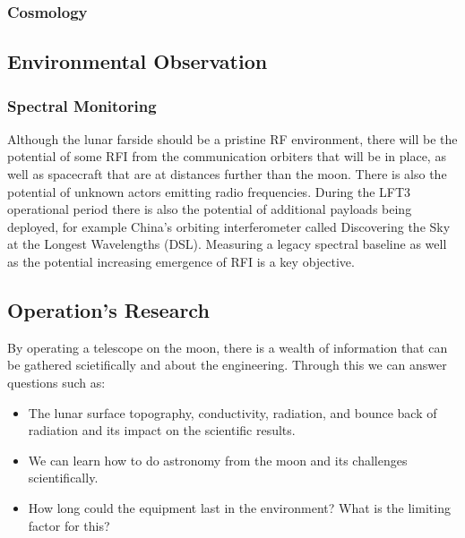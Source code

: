 \subsubsection{Cosmology} 

\subsection{Environmental Observation}

\subsubsection{Spectral Monitoring}
Although the lunar farside should be a pristine RF environment, there will be the potential of some RFI from the communication orbiters that will be in place, as well as spacecraft that are at distances further than the moon.  There is also the potential of unknown actors emitting radio frequencies.  During the LFT3 operational period there is also the potential of additional payloads being deployed, for example China's orbiting interferometer called Discovering the Sky at the Longest Wavelengths (DSL).  Measuring a legacy spectral baseline as well as the potential increasing emergence of RFI is a key objective.


\subsection{Operation's Research}
By operating a telescope on the moon, there is a wealth of information that can be gathered scietifically and about the engineering. Through this we can answer questions such as:

\begin{itemize}
    \item The lunar surface topography, conductivity, radiation, and bounce back of radiation and its impact on the scientific results.
    \item We can learn how to do astronomy from the moon and its challenges scientifically. 
    \item How long could the equipment last in the environment? What is the limiting factor for this?
\end{itemize}

